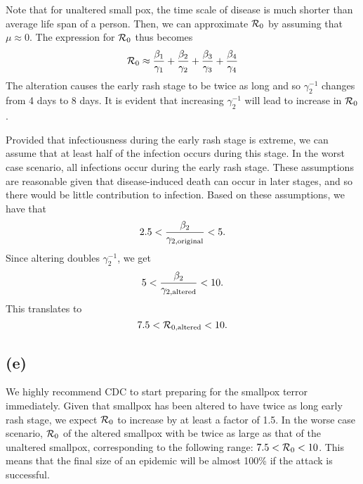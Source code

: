 \documentclass{article}
\begin{document}
Note that for unaltered small pox, the time scale of disease is much shorter than average life span of a person. Then, we can approximate ${\cal R}_0$ by assuming that $\mu \approx 0$. The expression for ${\cal R}_0$ thus becomes
$$
{\cal R}_0 \approx \frac{\beta_1}{\gamma_1} + \frac{\beta_2}{\gamma_2} + \frac{\beta_3}{\gamma_3} + \frac{\beta_4}{\gamma_4}
$$
The alteration causes the early rash stage to be twice as long and so $\gamma_2^{-1}$ changes from 4 days to 8 days.
It is evident that increasing $\gamma_2^{-1}$ will lead to increase in ${\cal R}_0$.

Provided that infectiousness during the early rash stage is extreme, we can assume that at least half of the infection occurs during this stage. In the worst case scenario, all infections occur during the early rash stage. These assumptions are reasonable given that disease-induced death can occur in later stages, and so there would be little contribution to infection.
Based on these assumptions, we have that
$$
2.5 < \frac{\beta_2}{\gamma_{2,\tiny{\textrm{original}}}} < 5.
$$
Since altering doubles $\gamma_2^{-1}$, we get
$$
5 < \frac{\beta_2}{\gamma_{2,\tiny{\textrm{altered}}}} < 10.
$$
This translates to
$$
7.5 < {\cal R}_{0, \tiny{\textrm{altered}}} <10.
$$

\subsection*{(e)}

We highly recommend CDC to start preparing for the smallpox terror immediately. Given that smallpox has been altered to have twice as long early rash stage, we expect ${\cal R}_0$ to increase by at least a factor of 1.5. In the worse case scenario, ${\cal R}_0$ of the altered smallpox with be twice as large as that of the unaltered smallpox, corresponding to the following range: $7.5 < {\cal R}_0 < 10$.
This means that the final size of an epidemic will be almost 100\% if the attack is successful.
\end{document}
